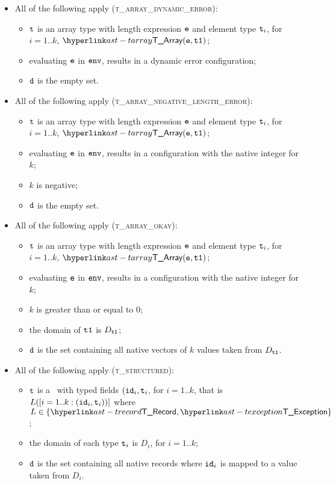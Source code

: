 \begin{itemize}
  \item All of the following apply (\textsc{t\_array\_dynamic\_error}):
  \begin{itemize}
    \item $\texttt{t}$ is an array type with length expression $\texttt{e}$ and element type $\texttt{t}_i$, for $i=1..k$, $\TArray(\ve, \vtone)$;
    \item evaluating $\texttt{e}$ in $\texttt{env}$, results in a dynamic error configuration;
    \item $\texttt{d}$ is the empty set.
  \end{itemize}

  \item All of the following apply (\textsc{t\_array\_negative\_length\_error}):
  \begin{itemize}
    \item $\texttt{t}$ is an array type with length expression $\texttt{e}$ and element type $\texttt{t}_i$, for $i=1..k$, $\TArray(\ve, \vtone)$;
    \item evaluating $\texttt{e}$ in $\texttt{env}$, results in a configuration with the native integer for $k$;
    \item $k$ is negative;
    \item $\texttt{d}$ is the empty set.
  \end{itemize}

  \item All of the following apply (\textsc{t\_array\_okay}):
  \begin{itemize}
    \item $\texttt{t}$ is an array type with length expression $\texttt{e}$ and element type $\texttt{t}_i$, for $i=1..k$, $\TArray(\ve, \vtone)$;
    \item evaluating $\texttt{e}$ in $\texttt{env}$, results in a configuration with the native integer for $k$;
    \item $k$ is greater than or equal to $0$;
    \item the domain of $\texttt{t1}$ is $D_{\texttt{t1}}$;
    \item $\texttt{d}$ is the set containing all native vectors of $k$ values taken from $D_{\texttt{t1}}$.
  \end{itemize}

  \item All of the following apply (\textsc{t\_structured}):
  \begin{itemize}
    \item $\texttt{t}$ is a \structuredtype\ with typed fields $(\texttt{id}_i, \texttt{t}_i$, for $i=1..k$, that is $L([i=1..k: (\texttt{id}_i,\texttt{t}_i))]$
    where $L\in\{\TRecord, \TException\}$;
    \item the domain of each type $\texttt{t}_i$ is $D_i$, for $i=1..k$;
    \item $\texttt{d}$ is the set containing all native records where $\texttt{id}_i$ is mapped to a value taken from $D_i$.
  \end{itemize}


\end{itemize}
